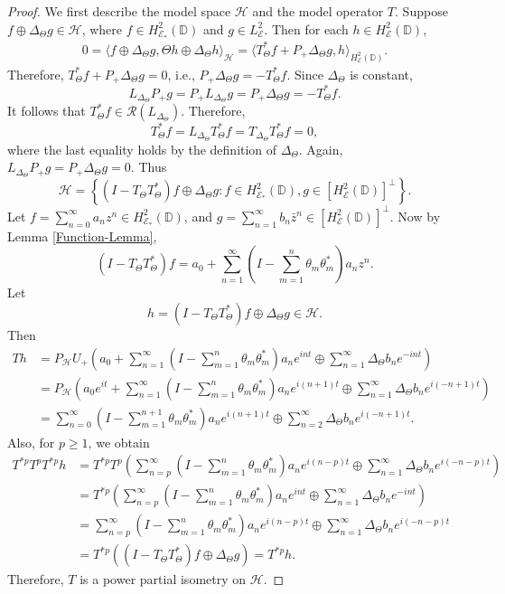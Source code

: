\documentclass[12pt]{amsart}
\newcommand{\cle}{\mathcal{E}}
\newcommand{\clh}{\mathcal{H}}
\newcommand{\clr}{\mathcal{R}}
\newcommand{\D}{\mathbb{D}}
\newcommand{\E}{\mathcal{E}}
\newcommand{\he}{{H}^2_\mathcal{E}(\mathbb{D})}
\theoremstyle{definition}
\theoremstyle{plain}
\theoremstyle{definition}
\numberwithin{equation}{section}
\begin{document}
\begin{proof}
We first describe the model space $\mathcal{H}$ and the model operator $T$. 
Suppose $f \oplus \Delta_{\Theta} g \in \mathcal{H}$, where $f \in H^2_{\cle_*}(\D)$ and $g \in L^2_\cle$. Then for each $h \in \he$,
\begin{align*}
0= \langle f \oplus\Delta_{\Theta} g, \Theta h\oplus \Delta_{\Theta} h \rangle_\clh =  \langle T_\Theta^* f + P_+ \Delta_{\Theta} g,h \rangle_{H^2_{\cle}(\D)}.
\end{align*}
Therefore, $T_\Theta^* f + P_+ \Delta_{\Theta} g=0$, i.e., $P_+\Delta_{\Theta} g=-T_\Theta^*f$. Since $\Delta_{\Theta}$ is constant, 
\[
L_{\Delta_\Theta}P_+g =P_+ L_{\Delta_\Theta} g= P_+\Delta_{\Theta} g=-T_\Theta^*f. 
\]
It follows that $T_\Theta ^*f \in \clr(L_{\Delta_\Theta})$. Therefore,
\[
T_\Theta^*f =L_{\Delta_\Theta} T_\Theta^*f= T_{\Delta_{\Theta}}T_\Theta^*f= 0,
\]
where the last equality holds by the definition of  $\Delta_{\Theta}$. Again, $L_{\Delta_\Theta} P_+g=P_+\Delta_{\Theta} g=0$. Thus
\[
\clh=\left\{(I-T_\Theta T_\Theta^*)f\oplus\Delta_{\Theta} g: f \in H^2_{\E_*}(\D), g \in [\he]^\perp\right\}.
\]
Let $f=\sum\limits_{n=0}^\infty  a_nz^n \in H^2_{\E_*}(\D)$, and $g=\sum\limits_{n=1}^{\infty}  b_n\bar{z}^n\in [\he]^\perp$.
Now by Lemma \ref{Function-Lemma},
\[
(I-T_\Theta T_\Theta^*)f=a_0+\sum\limits_{n=1}^\infty \left(I-\sum\limits_{m=1}^n \theta_m\theta_m^*\right)a_nz^n.
\]
Let 
\[
h=(I -T_\Theta T_\Theta^*)f \oplus \Delta_{\Theta} g \in \clh. 
\]
Then
\begin{align*}
Th &=P_\mathcal{H}U_+\left(a_0+\sum\limits_{n=1}^\infty\left(I-\sum\limits_{m=1}^n \theta_m\theta_m^*\right)a_ne^{int}\oplus\sum\limits_{n=1}^{\infty} \Delta_{\Theta}b_ne^{-int}\right)\\
 &=P_\mathcal{H}\left(a_0e^{it}+\sum\limits_{n=1}^\infty \left(I-\sum\limits_{m=1}^n \theta_m\theta_m^*\right)a_ne^{i(n+1)t}\oplus\sum\limits_{n=1}^{\infty} \Delta_{\Theta}b_ne^{i(-n+1)t}\right)\\
&=\sum\limits_{n=0}^\infty \left(I- \sum\limits_{m=1}^{n+1}\theta_m\theta_m^*\right)a_ne^{i(n+1)t}\oplus\sum\limits_{n=2}^{\infty}\Delta_{\Theta}b_ne^{i(-n+1)t}.
\end{align*}
Also, for $p \geq 1$, we obtain
\begin{align*}
T^{*p}T^pT^{*p}h &=T^{*p}T^p\left(\sum\limits_{n=p}^\infty \left(I-\sum\limits_{m=1}^n \theta_m\theta_m^*\right)a_ne^{i(n-p)t}\oplus\sum\limits_{n=1}^{\infty}\Delta_{\Theta}b_ne^{i(-n-p)t}\right)\\
&=T^{*p}\left(\sum\limits_{n=p}^\infty\left(I-\sum\limits_{m=1}^n \theta_m\theta_m^*\right)a_ne^{int}\oplus\sum\limits_{n=1}^\infty\Delta_{\Theta}b_ne^{-int}\right)\\
&= \sum\limits_{n=p}^\infty \left(I-\sum\limits_{m=1}^n \theta_m\theta_m^*\right)a_ne^{i(n-p)t}\oplus\sum\limits_{n=1}^{\infty}\Delta_{\Theta}b_ne^{i(-n-p)t}\\
&=T^{*p}((I-T_\Theta T_\Theta^*)f\oplus\Delta_{\Theta} g)=T^{*p}h.
\end{align*}
Therefore, $T$ is a power partial isometry on $\clh$.




\end{proof}
\end{document}
